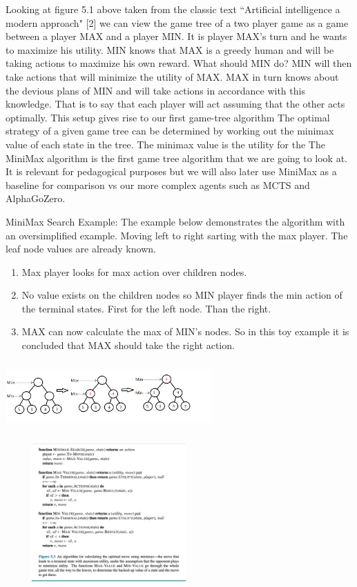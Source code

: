 Looking at figure 5.1 above taken from the classic text ``Artificial intelligence a modern approach" [2] we can view the game tree of a two player game as a game between a player MAX and a player MIN. It is player MAX's turn and he wants to maximize his utility. MIN knows that MAX is a greedy human and will be taking actions to maximize his own reward. What should MIN do? MIN will then take actions that will minimize the utility of MAX. MAX in turn knows about the devious plans of MIN and will take actions in accordance with this knowledge. That is to say that each player will act assuming that the other acts optimally. This setup gives rise to our first game-tree algorithm  
The optimal strategy of a given game tree can be determined by working out the minimax value of each state in the tree. The minimax value is the utility for the 
The MiniMax algorithm is the first game tree algorithm that we are going to look at. It is relevant for pedagogical purposes but we will also later use MiniMax as a baseline for comparison vs our more complex agents such as MCTS and AlphaGoZero. 

MiniMax Search Example: The example below demonstrates the algorithm with an oversimplified example. Moving left to right sarting with the max player. The leaf node values are already known. 

\begin{enumerate}
    \item Max player looks for max action over children nodes.  
    \item No value exists on the children nodes so MIN player finds the min action of the terminal states. First for the left node. Than the right. 
    \item MAX can now calculate the max of MIN's nodes. So in this toy example it is concluded that MAX should take the right action. 
\end{enumerate}

\includegraphics[width=300px,height=100px]{images/minimax_example.png}

\includegraphics[width=300px,height=200px]{images/minimax_algo.png}

